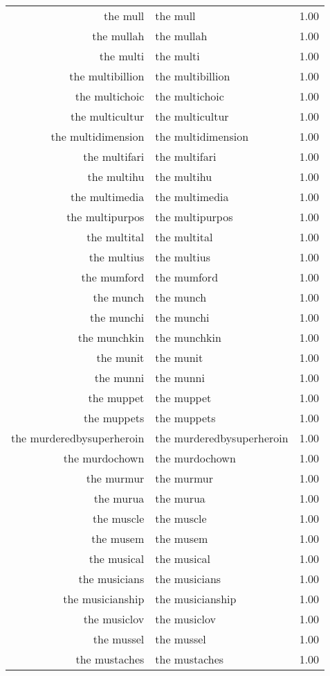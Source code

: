 \begin{table}[ht]
\begin{tabular}{rlr}
  the mull & the mull & 1.00 \\ 
  the mullah & the mullah & 1.00 \\ 
  the multi & the multi & 1.00 \\ 
  the multibillion & the multibillion & 1.00 \\ 
  the multichoic & the multichoic & 1.00 \\ 
  the multicultur & the multicultur & 1.00 \\ 
  the multidimension & the multidimension & 1.00 \\ 
  the multifari & the multifari & 1.00 \\ 
  the multihu & the multihu & 1.00 \\ 
  the multimedia & the multimedia & 1.00 \\ 
  the multipurpos & the multipurpos & 1.00 \\ 
  the multital & the multital & 1.00 \\ 
  the multius & the multius & 1.00 \\ 
  the mumford & the mumford & 1.00 \\ 
  the munch & the munch & 1.00 \\ 
  the munchi & the munchi & 1.00 \\ 
  the munchkin & the munchkin & 1.00 \\ 
  the munit & the munit & 1.00 \\ 
  the munni & the munni & 1.00 \\ 
  the muppet & the muppet & 1.00 \\ 
  the muppets & the muppets & 1.00 \\ 
  the murderedbysuperheroin & the murderedbysuperheroin & 1.00 \\ 
  the murdochown & the murdochown & 1.00 \\ 
  the murmur & the murmur & 1.00 \\ 
  the murua & the murua & 1.00 \\ 
  the muscle & the muscle & 1.00 \\ 
  the musem & the musem & 1.00 \\ 
  the musical & the musical & 1.00 \\ 
  the musicians & the musicians & 1.00 \\ 
  the musicianship & the musicianship & 1.00 \\ 
  the musiclov & the musiclov & 1.00 \\ 
  the mussel & the mussel & 1.00 \\ 
  the mustaches & the mustaches & 1.00 \\ 

\end{tabular}
\end{table}
